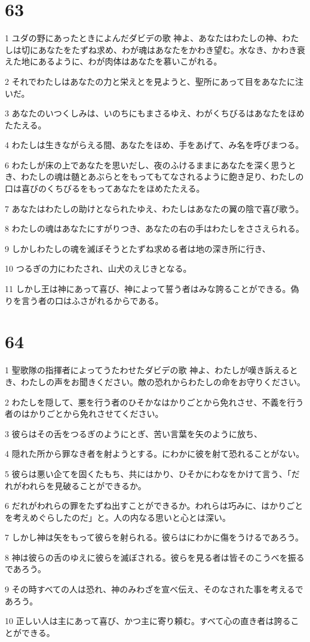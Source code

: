 \chapter{63}

\par 1 ユダの野にあったときによんだダビデの歌 神よ、あなたはわたしの神、わたしは切にあなたをたずね求め、わが魂はあなたをかわき望む。水なき、かわき衰えた地にあるように、わが肉体はあなたを慕いこがれる。
\par 2 それでわたしはあなたの力と栄えとを見ようと、聖所にあって目をあなたに注いだ。
\par 3 あなたのいつくしみは、いのちにもまさるゆえ、わがくちびるはあなたをほめたたえる。
\par 4 わたしは生きながらえる間、あなたをほめ、手をあげて、み名を呼びまつる。
\par 6 わたしが床の上であなたを思いだし、夜のふけるままにあなたを深く思うとき、わたしの魂は髄とあぶらとをもってもてなされるように飽き足り、わたしの口は喜びのくちびるをもってあなたをほめたたえる。
\par 7 あなたはわたしの助けとなられたゆえ、わたしはあなたの翼の陰で喜び歌う。
\par 8 わたしの魂はあなたにすがりつき、あなたの右の手はわたしをささえられる。
\par 9 しかしわたしの魂を滅ぼそうとたずね求める者は地の深き所に行き、
\par 10 つるぎの力にわたされ、山犬のえじきとなる。
\par 11 しかし王は神にあって喜び、神によって誓う者はみな誇ることができる。偽りを言う者の口はふさがれるからである。

\chapter{64}

\par 1 聖歌隊の指揮者によってうたわせたダビデの歌 神よ、わたしが嘆き訴えるとき、わたしの声をお聞きください。敵の恐れからわたしの命をお守りください。
\par 2 わたしを隠して、悪を行う者のひそかなはかりごとから免れさせ、不義を行う者のはかりごとから免れさせてください。
\par 3 彼らはその舌をつるぎのようにとぎ、苦い言葉を矢のように放ち、
\par 4 隠れた所から罪なき者を射ようとする。にわかに彼を射て恐れることがない。
\par 5 彼らは悪い企てを固くたもち、共にはかり、ひそかにわなをかけて言う、「だれがわれらを見破ることができるか。
\par 6 だれがわれらの罪をたずね出すことができるか。われらは巧みに、はかりごとを考えめぐらしたのだ」と。人の内なる思いと心とは深い。
\par 7 しかし神は矢をもって彼らを射られる。彼らはにわかに傷をうけるであろう。
\par 8 神は彼らの舌のゆえに彼らを滅ぼされる。彼らを見る者は皆そのこうべを振るであろう。
\par 9 その時すべての人は恐れ、神のみわざを宣べ伝え、そのなされた事を考えるであろう。
\par 10 正しい人は主にあって喜び、かつ主に寄り頼む。すべて心の直き者は誇ることができる。

